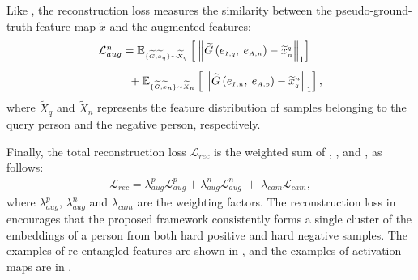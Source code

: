 Like , the reconstruction loss measures the similarity between the pseudo-ground-truth feature map $\widetilde{x}$ and the augmented features:  
\begin{align} \label{eq:recon_loss_neg}
\begin{array}{l}
    \mathcal{L}_{aug}^{n} = 
    \mathbb{E}_{\scriptscriptstyle \{ \widetilde{G}, \widetilde{x}_{\scriptscriptstyle q}\}\sim \widetilde{X}_{\scriptscriptstyle q}} \left[\:\left\Vert \widetilde{G}\left(e_{\scriptscriptstyle I, q},\:e_{\scriptscriptstyle A, n}
    \right)
    - \widetilde{x}_{\scriptscriptstyle n}^{\scriptscriptstyle q} \right\Vert_{1} \right] \vspace{0.3cm}\\
     \hspace{1cm} + \:\mathbb{E}_{\scriptscriptstyle \{ \widetilde{G}, \widetilde{x}_{\scriptscriptstyle n}\}\sim \widetilde{X}_{\scriptscriptstyle n}} \left[\: \left\Vert \widetilde{G}\left( e_{\scriptscriptstyle I, n},\: e_{\scriptscriptstyle A, p}
    \right)
    - \widetilde{x}_{\scriptscriptstyle q}^{\scriptscriptstyle n} \right\Vert_{1} \right],
\end{array}\end{align}
where $\widetilde{X}_q$ and $\widetilde{X}_n$ represents the feature distribution of samples belonging to the query person and the negative person, respectively. 

Finally, the total reconstruction loss $\mathcal{L}_{rec}$ is the weighted sum of ,  , and ,  as follows:
\begin{align}\label{eq:rec_loss}
    \mathcal{L}_{rec} = \lambda_{aug}^{p}\mathcal{L}_{aug}^{p} + \lambda_{aug}^{n}\mathcal{L}_{aug}^{n} \:+\: \lambda_{cam}\mathcal{L}_{cam},
\end{align}
where $\lambda_{aug}^{p}$, $\lambda_{aug}^{n}$ and $\lambda_{cam}$ are the weighting factors. The reconstruction loss in  encourages that the proposed framework consistently forms a single cluster of the embeddings of a person from both hard positive and hard negative samples. The examples of re-entangled features are shown in , and the examples of activation maps are in . 
\vspace{0.2cm}